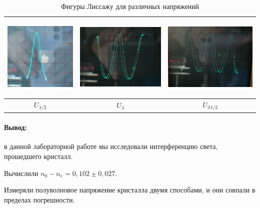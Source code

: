 \documentclass[a4paper,12pt]{article}
\begin{document}
\begin{table}[h]
\centering
\begin{tabular}{|c|c|c|}
\hline
\includegraphics[height=4cm]{liss1.png}  & \includegraphics[height=4cm]{liss2.png}  &  \includegraphics[height=4cm]{liss3.png} \\ \hline
$U_{\lambda/2}$ & $U_{\lambda}$ & $U_{3\lambda/2}$ \\ \hline
\end{tabular}
\caption{Фигуры Лиссажу для различных напряжений}
\label{tab:my-table}
\end{table}

\paragraph{Вывод:} в данной лабораторной работе мы исследовали интерференцию света, прошедшего кристалл. \par
Вычислили $n_0-n_e = 0,102\pm 0,027$. \par
Измеряли полуволновое напряжение кристалла двумя способами, и они совпали в пределах погрешности.
\end{document}

